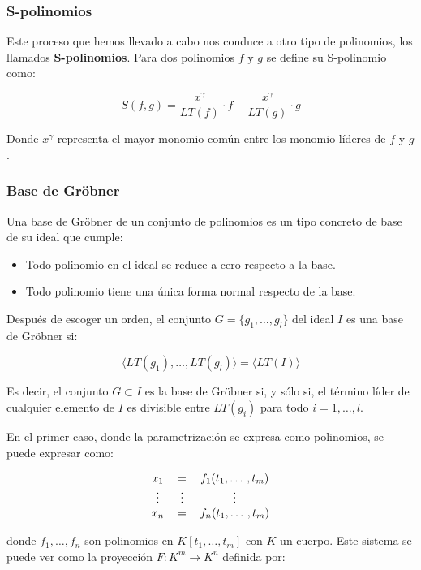 \subsubsection*{S-polinomios}

Este proceso que hemos llevado a cabo nos conduce a otro tipo de polinomios, los llamados \textbf{S-polinomios}. Para dos polinomios $f$ y $g$ se define su S-polinomio como:

$$S(f,g) = \frac{x^{\gamma}}{LT(f)} \cdot f - \frac{x^{\gamma}}{LT(g)} \cdot g$$

Donde $x^{\gamma}$ representa el mayor monomio común entre los monomio líderes de $f$ y $g$.

\subsubsection*{Base de Gröbner}

Una base de Gröbner de un conjunto de polinomios es un tipo concreto de base de su ideal que cumple:

\begin{itemize}
    \item Todo polinomio en el ideal se reduce a cero respecto a la base.
    \item Todo polinomio tiene una única forma normal respecto de la base.
\end{itemize}

Después de escoger un orden, el conjunto $G = \{ g_1, \dotso, g_l \}$ del ideal $I$ es una base de Gröbner si:

$$\langle LT(g_1), \dotso, LT(g_l) \rangle = \langle LT(I) \rangle$$

Es decir, el conjunto $G \subset I$ es la base de Gröbner si, y sólo si, el término líder de cualquier elemento de $I$ es divisible entre $LT(g_i)$ para todo $i = 1, \dotso, l$.
\par
En el primer caso, donde la parametrización se expresa como polinomios, se puede expresar como:

\begin{equation}
\begin{tabular}{c c c}
$x_1$ & $=$ & $f_1(t_1, \dotso, t_m)$ \\
$\vdots$ & $\vdots$ & $\vdots$ \\
$x_n$ & $=$ & $f_n(t_1, \dotso, t_m)$
\end{tabular}
\nonumber
\end{equation}

donde $f_1, \dotso, f_n$ son polinomios en $K[t_1, \dotso, t_m]$ con $K$ un cuerpo. Este sistema se puede ver como la proyección $F : K^m \to K^n$ definida por:

